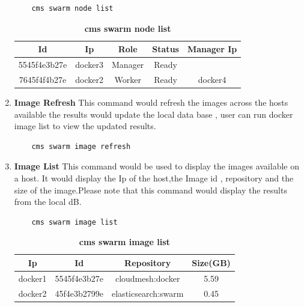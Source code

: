 \documentclass[9pt,twocolumn,twoside]{../../styles/osajnl}
\begin{document}
\begin{enumerate}
    \begin{verbatim}
    cms swarm node list
    \end{verbatim} 

     \begin{table}[htbp]
     \caption{\bf cms swarm node list }
     \begin{tabular}{ccccc}
     \hline
      Id & Ip & Role &Status & Manager Ip\\
      \hline
      5545f4e3b27e &docker3& Manager&Ready&  \\
      7645f4f4b27e &docker2& Worker&Ready&docker4  \\
     \hline
     \end{tabular}
     \label{tab:shape-functions}
     \end{table}
     
    \item \textbf{Image Refresh}
    This command would refresh the images across the hosts available the results would update the local data base , user can run docker image list to view the updated results.
    
    \begin{verbatim}
    cms swarm image refresh
    \end{verbatim} 
     
    \item \textbf{Image List}
    This command would be used to display the images available on a host.
    It would display the Ip of the host,the Image id , repository and the size of the image.Please note that this command would display the results from the local dB.\\
    
    \begin{verbatim}
    cms swarm image list
    \end{verbatim} 
    
    \begin{table}[htbp]
     \caption{\bf cms swarm image list }
     \begin{tabular}{cccc}
     \hline
      Ip & Id & Repository & Size(GB)\\
      \hline
      docker1 & 5545f4e3b27e & cloudmesh:docker & 5.59 \\
      docker2 & 45f4e3b2799e & elasticsearch:swarm & 0.45 \\
     \hline
     \end{tabular}
     \label{tab:shape-functions}
     \end{table}
     

\end{enumerate}
\end{document}
